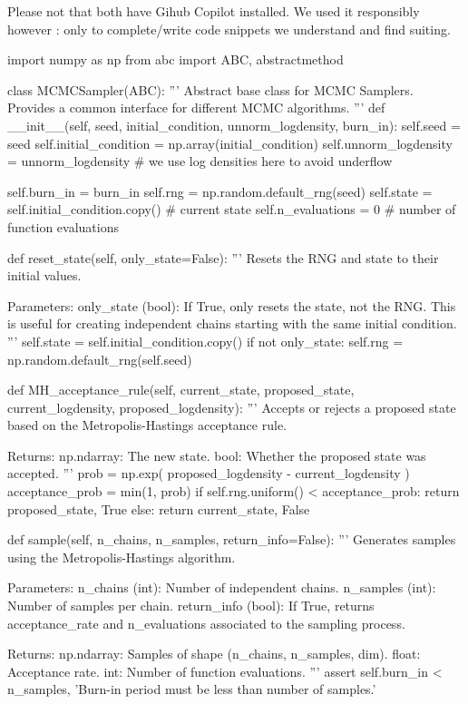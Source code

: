 \documentclass[a4paper, 12pt,oneside]{article}
\begin{document}
		Please not that both have Gihub Copilot installed. We used it responsibly however : only to complete/write code snippets we understand and find suiting.
		\begin{python}
		import numpy as np
		from abc import ABC, abstractmethod

		class MCMCSampler(ABC):
			'''
			Abstract base class for MCMC Samplers. Provides a common interface for different MCMC algorithms.
			'''
			def __init__(self, seed, initial_condition, unnorm_logdensity, burn_in):
				self.seed = seed
				self.initial_condition = np.array(initial_condition)
				self.unnorm_logdensity = unnorm_logdensity
				# we use log densities here to avoid underflow
				
				self.burn_in = burn_in
				self.rng = np.random.default_rng(seed)
				self.state = self.initial_condition.copy() # current state
				self.n_evaluations = 0 # number of function evaluations
			
			def reset_state(self, only_state=False):
				'''
				Resets the RNG and state to their initial values.

				Parameters:
				only_state (bool): If True, only resets the state, not the RNG. This is useful for creating independent chains starting with the same initial condition.
				'''
				self.state = self.initial_condition.copy()
				if not only_state:
					self.rng = np.random.default_rng(self.seed)
			
			def MH_acceptance_rule(self, current_state, proposed_state, current_logdensity, proposed_logdensity):
				'''
				Accepts or rejects a proposed state based on the Metropolis-Hastings acceptance rule.

				Returns:
				np.ndarray: The new state.
				bool: Whether the proposed state was accepted.
				'''
				prob = np.exp( proposed_logdensity - current_logdensity )
				acceptance_prob = min(1, prob)
				if self.rng.uniform() < acceptance_prob:
					return proposed_state, True
				else:
					return current_state, False

			def sample(self, n_chains, n_samples, return_info=False):
				'''
				Generates samples using the Metropolis-Hastings algorithm.

				Parameters:
				n_chains (int): Number of independent chains.
				n_samples (int): Number of samples per chain.
				return_info (bool): If True, returns acceptance_rate and n_evaluations associated to the sampling process.

				Returns:
				np.ndarray: Samples of shape (n_chains, n_samples, dim).
				float: Acceptance rate.
				int: Number of function evaluations.
				'''
				assert self.burn_in < n_samples, 'Burn-in period must be less than number of samples.'


\end{python}
\end{document}
